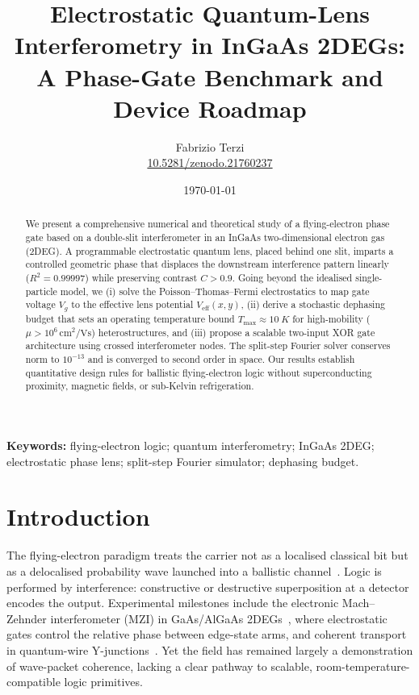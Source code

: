 \documentclass[11pt,a4paper]{article}
\title{\textbf{Electrostatic Quantum-Lens Interferometry in InGaAs 2DEGs:\\
A Phase-Gate Benchmark and Device Roadmap}}
\author{Fabrizio Terzi\\
\small{\href{https://doi.org/10.5281/zenodo.21760237}{10.5281/zenodo.21760237}}}
\date{\today}
\begin{document}
\maketitle

\begin{abstract}
We present a comprehensive numerical and theoretical study of a flying-electron 
phase gate based on a double-slit interferometer in an InGaAs two-dimensional 
electron gas (2DEG). A programmable electrostatic quantum lens, placed behind 
one slit, imparts a controlled geometric phase that displaces the downstream 
interference pattern linearly ($R^2=0.99997$) while preserving contrast $C>0.9$. 
Going beyond the idealised single-particle model, we (i) solve the Poisson--Thomas--Fermi 
electrostatics to map gate voltage $V_g$ to the effective lens potential 
$V_{\text{eff}}(x,y)$, (ii) derive a stochastic dephasing budget that sets an 
operating temperature bound $T_{\max}\approx\SI{10}{K}$ for high-mobility 
($\mu>10^6\,\text{cm}^2\text{/Vs}$) heterostructures, and (iii) propose a 
scalable two-input XOR gate architecture using crossed interferometer nodes. 
The split-step Fourier solver conserves norm to $10^{-13}$ and is converged 
to second order in space. Our results establish quantitative design rules for 
ballistic flying-electron logic without superconducting proximity, magnetic 
fields, or sub-Kelvin refrigeration.
\end{abstract}

\noindent\textbf{Keywords:} flying-electron logic; quantum interferometry; 
InGaAs 2DEG; electrostatic phase lens; split-step Fourier simulator; 
dephasing budget.

\section{Introduction}
\label{sec:intro}

The flying-electron paradigm treats the carrier not as a localised classical 
bit but as a delocalised probability wave launched into a ballistic 
channel~\cite{bertoni2000,ji2003,bliokh2017}. Logic is performed by 
interference: constructive or destructive superposition at a detector encodes 
the output. Experimental milestones include the electronic Mach--Zehnder 
interferometer (MZI) in GaAs/AlGaAs 2DEGs~\cite{ji2003}, where electrostatic 
gates control the relative phase between edge-state arms, and coherent 
transport in quantum-wire Y-junctions~\cite{bertoni2000}. Yet the field has 
remained largely a demonstration of wave-packet coherence, lacking a clear 
pathway to scalable, room-temperature-compatible logic primitives.
\end{document}
